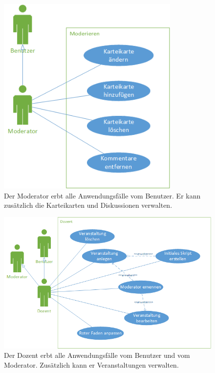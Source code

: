 \documentclass[12pt,a4paper]{article}
\begin{document}
\begin{figure}[H]
	\centering
	\includegraphics[height=10cm]{Bilder/Anwendungsfalldiagramme/Moderator.png}
	\caption{Der Moderator erbt alle Anwendungsfälle vom Benutzer. Er kann zusätzlich die Karteikarten und Diskussionen verwalten.}
	\label{AwfModerator}
\end{figure}

\begin{figure}[H]
	\centering
	\includegraphics[width=\textwidth]{Bilder/Anwendungsfalldiagramme/Dozent.png}
	\caption{Der Dozent erbt alle Anwendungsfälle vom Benutzer und vom Moderator. Zusätzlich kann er Veranstaltungen verwalten.}
	\label{AwfDozent}
\end{figure}
\end{document}

